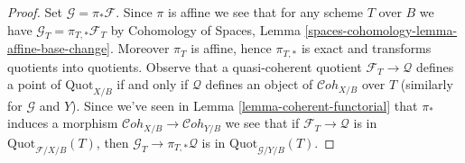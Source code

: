 \documentclass[10pt,a4paper]{amsart}
\theoremstyle{plain}
\theoremstyle{definition}
\theoremstyle{remark}
\numberwithin{equation}{subsection}
\def\Cohstack{\mathcal{C}\!\mathit{oh}}
\def\Quotfunctor{\mathrm{Quot}}
\begin{document}
\begin{proof}
Set $\mathcal{G} = \pi_*\mathcal{F}$. Since $\pi$ is affine we see that for
any scheme $T$ over $B$ we have $\mathcal{G}_T = \pi_{T, *}\mathcal{F}_T$ by
Cohomology of Spaces, Lemma \ref{spaces-cohomology-lemma-affine-base-change}.
Moreover $\pi_T$ is affine, hence $\pi_{T, *}$ is exact and transforms
quotients into quotients. Observe that a quasi-coherent quotient
$\mathcal{F}_T \to \mathcal{Q}$ defines a point of $\Quotfunctor_{X/B}$
if and only if $\mathcal{Q}$ defines an object of $\Cohstack_{X/B}$
over $T$ (similarly for $\mathcal{G}$ and $Y$). Since we've seen in
Lemma \ref{lemma-coherent-functorial}
that $\pi_*$ induces a morphism $\Cohstack_{X/B} \to \Cohstack_{Y/B}$
we see that if $\mathcal{F}_T \to \mathcal{Q}$ is in
$\Quotfunctor_{\mathcal{F}/X/B}(T)$, then
$\mathcal{G}_T \to \pi_{T, *}\mathcal{Q}$ is
in $\Quotfunctor_{\mathcal{G}/Y/B}(T)$.
\end{proof}
\end{document}

